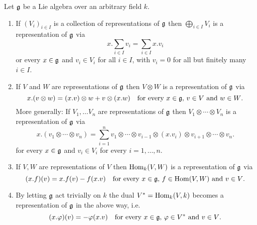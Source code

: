 \begin{proposition}\label{prop: new representations from old ones}
 Let $\mathfrak{g}$ be a Lie algebra over an arbitrary field $k$.
 \begin{enumerate}[leftmargin=*]
  \item
   If $(V_i)_{i \in I}$ is a collection of representations of $\mathfrak{g}$ then $\bigoplus_{i \in I} V_i$ is a representation of $\mathfrak{g}$ via
   \[
    x.\sum_{i \in I} v_i = \sum_{i \in I} x.v_i
   \]
   or every $x \in \mathfrak{g}$ and $v_i \in V_i$ for all $i \in I$, with $v_i = 0$ for all but finitely many $i \in I$.
  \item
   If $V$ and $W$ are representations of $\mathfrak{g}$ then $V \otimes W$ is a representation of $\mathfrak{g}$ via
   \[
    x.(v \otimes w) = (x.v) \otimes w + v \otimes (x.w) \quad \text{for every $x \in \mathfrak{g}$, $v \in V$ and $w \in W$}.
   \]
   More generally: If $V_1, \dotsc V_n$ are representations of $\mathfrak{g}$ then $V_1 \otimes \dotsb \otimes V_n$ is a representation of $\mathfrak{g}$ via
   \[
    x.(v_1 \otimes \dotsb \otimes v_n)
    = \sum_{i=1}^n v_1 \otimes \dotsb \otimes v_{i-1} \otimes (x.v_i) \otimes v_{i+1} \otimes \dotsb \otimes v_n.
   \]
   for every $x \in \mathfrak{g}$ and $v_i \in V_i$ for every $i = 1, \dotsc, n$.
  \item
   If $V, W$ are representations of $V$ then $\operatorname{Hom}_k(V,W)$ is a representation of $\mathfrak{g}$ via
   \[
    (x.f)(v) = x.f(v) - f(x.v) \quad \text{for every $x \in \mathfrak{g}$, $f \in \operatorname{Hom}(V,W)$ and $v \in V$}.
   \]
  \item
   By letting $\mathfrak{g}$ act trivially on $k$ the dual $V^* = \operatorname{Hom}_k(V,k)$ becomes a representation of $\mathfrak{g}$ in the above way, i.e.
   \[
    (x.\varphi)(v) = -\varphi(x.v) \quad \text{for every $x \in \mathfrak{g}$, $\varphi \in V^*$ and $v \in V$}.
   \]
 \end{enumerate}
\end{proposition}
